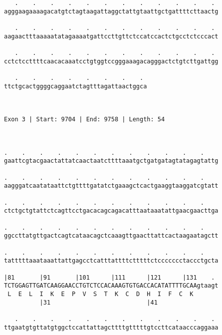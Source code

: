 \documentclass{article}
\begin{document}
\begin{Verbatim}
   .    .    .    .    .    .    .    .    .    .    .    . 
agggaagaaaagacatgtctagtaagattaggctattgtaattgctgattttcttaactg
                                                            
   .    .    .    .    .    .    .    .    .    .    .    . 
aagaactttaaaaatatagaaaatgattccttgttctccatccactctgcctctcccact
                                                            
   .    .    .    .    .    .    .    .    .    .    .    . 
cctctccttttcaacacaaatcctgtggtccgggaaagacagggactctgtcttgattgg
                                                            
   .    .    .    .    .    .    .    . 
ttctgcactggggcaggaatctagtttagattaactggca
                                        
                                        
 
Exon 3 | Start: 9704 | End: 9758 | Length: 54



.    .    .    .    .    .    .    .    .    .    .    .    
gaattcgtacgaactattatcaactaatcttttaaatgctgatgatagtatagagtattg
                                                            
.    .    .    .    .    .    .    .    .    .    .    .    
aagggatcaatataattctgttttgatatctgaaagctcactgaaggtaaggatcgtatt
                                                            
.    .    .    .    .    .    .    .    .    .    .    .    
ctctgctgtattctcagttcctgacacagcagacatttaataaatattgaacgaacttga
                                                            
.    .    .    .    .    .    .    .    .    .    .    .    
ggccttatgttgactcagtcataacagctcaaagttgaacttattcactaagaatagctt
                                                            
.    .    .    .    .    .    .    .    .    .    .    .    
tatttttaaataaattattgagcctcatttattttctttttctccccccctaccctgcta
                                                            
|81       |91       |101      |111      |121      |131    . 
TCTGGAGTTGATCAAGGAACCTGTCTCCACAAAGTGTGACCACATATTTTGCAAgtaagt
 L  E  L  I  K  E  P  V  S  T  K  C  D  H  I  F  C  K       
          |31                           |41                 
  
   .    .    .    .    .    .    .    .    .    .    .    . 
ttgaatgtgttatgtggctccattattagcttttgtttttgtccttcataacccaggaaa
                                                            

\end{Verbatim}
\end{document}
